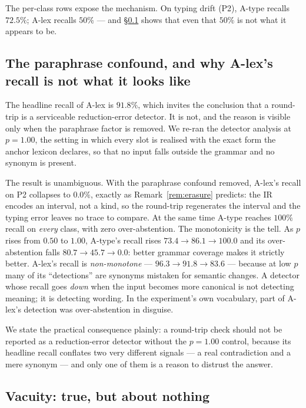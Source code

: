 \documentclass[11pt]{article}
\newcommand{\Alex}{\textsf{A-lex}}
\newcommand{\Atype}{\textsf{A-type}}
\theoremstyle{definition}
\begin{document}
The per-class rows expose the mechanism. On typing drift (P2), \Atype{} recalls
$72.5\%$; \Alex{} recalls $50\%$ --- and \S\ref{sec:confound} shows that even that
$50\%$ is not what it appears to be.

\subsection{The paraphrase confound, and why \Alex's recall is not what it looks like}
\label{sec:confound}

The headline recall of \Alex{} is $91.8\%$, which invites the conclusion that a
round-trip is a serviceable reduction-error detector. It is not, and the reason
is visible only when the paraphrase factor is removed. We re-ran the detector
analysis at $p = 1.00$, the setting in which every slot is realised with the
exact form the anchor lexicon declares, so that no input falls outside the
grammar and no synonym is present.



The result is unambiguous. With the paraphrase confound removed, \Alex's recall on
P2 collapses to $0.0\%$, exactly as Remark~\ref{rem:erasure} predicts: the IR
encodes an interval, not a kind, so the round-trip regenerates the interval and
the typing error leaves no trace to compare. At the same time \Atype{} reaches
$100\%$ recall on \emph{every} class, with zero over-abstention. The monotonicity
is the tell. As $p$ rises from $0.50$ to $1.00$, \Atype's recall rises
$73.4 \to 86.1 \to 100.0$ and its over-abstention falls $80.7 \to 45.7 \to 0.0$:
better grammar coverage makes it strictly better. \Alex's recall is
\emph{non-monotone} --- $96.3 \to 91.8 \to 83.6$ --- because at low $p$ many of
its ``detections'' are synonyms mistaken for semantic changes. A detector whose
recall goes \emph{down} when the input becomes more canonical is not detecting
meaning; it is detecting wording. In the experiment's own vocabulary, part of
\Alex's detection was over-abstention in disguise.

We state the practical consequence plainly: a round-trip check should not be
reported as a reduction-error detector without the $p = 1.00$ control, because its
headline recall conflates two very different signals --- a real contradiction and
a mere synonym --- and only one of them is a reason to distrust the answer.

\subsection{Vacuity: true, but about nothing}
\label{sec:vacuity}
\end{document}
